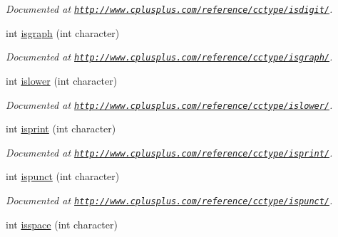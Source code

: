 \begin{DoxyCompactItemize}
\begin{DoxyCompactList}\small\item\em Documented at \href{http://www.cplusplus.com/reference/cctype/isdigit/}{\tt http\-://www.\-cplusplus.\-com/reference/cctype/isdigit/}. \end{DoxyCompactList}\item 
\hypertarget{group__char_ga1039b6c101d508772749b7215b384b79}{int \hyperlink{group__char_ga1039b6c101d508772749b7215b384b79}{isgraph} (int character)}\label{group__char_ga1039b6c101d508772749b7215b384b79}

\begin{DoxyCompactList}\small\item\em Documented at \href{http://www.cplusplus.com/reference/cctype/isgraph/}{\tt http\-://www.\-cplusplus.\-com/reference/cctype/isgraph/}. \end{DoxyCompactList}\item 
\hypertarget{group__char_gab25707223aa5f16874de9e01f03f2991}{int \hyperlink{group__char_gab25707223aa5f16874de9e01f03f2991}{islower} (int character)}\label{group__char_gab25707223aa5f16874de9e01f03f2991}

\begin{DoxyCompactList}\small\item\em Documented at \href{http://www.cplusplus.com/reference/cctype/islower/}{\tt http\-://www.\-cplusplus.\-com/reference/cctype/islower/}. \end{DoxyCompactList}\item 
\hypertarget{group__char_ga654407156e7999d80962c790909f9b22}{int \hyperlink{group__char_ga654407156e7999d80962c790909f9b22}{isprint} (int character)}\label{group__char_ga654407156e7999d80962c790909f9b22}

\begin{DoxyCompactList}\small\item\em Documented at \href{http://www.cplusplus.com/reference/cctype/isprint/}{\tt http\-://www.\-cplusplus.\-com/reference/cctype/isprint/}. \end{DoxyCompactList}\item 
\hypertarget{group__char_gaa1b926a76401d6d0f8df0d5c1abfbeea}{int \hyperlink{group__char_gaa1b926a76401d6d0f8df0d5c1abfbeea}{ispunct} (int character)}\label{group__char_gaa1b926a76401d6d0f8df0d5c1abfbeea}

\begin{DoxyCompactList}\small\item\em Documented at \href{http://www.cplusplus.com/reference/cctype/ispunct/}{\tt http\-://www.\-cplusplus.\-com/reference/cctype/ispunct/}. \end{DoxyCompactList}\item 
\hypertarget{group__char_ga316ae9ebc4383bf1a2a5bfb9c980ce3e}{int \hyperlink{group__char_ga316ae9ebc4383bf1a2a5bfb9c980ce3e}{isspace} (int character)}\label{group__char_ga316ae9ebc4383bf1a2a5bfb9c980ce3e}


\end{DoxyCompactItemize}
